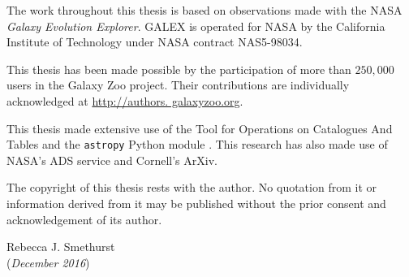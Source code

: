\documentclass[12pt,useAMS]{ociamthesis}  %
\begin{document}
\begin{originalitylong}
The work throughout this thesis is based on observations made with the NASA \emph{Galaxy Evolution Explorer}. GALEX is operated for NASA by the California Institute of Technology under NASA contract NAS5-98034.

This thesis has been made possible by the participation of more than $250,000$ users in the Galaxy Zoo project. Their contributions are individually acknowledged at \url{http://authors. galaxyzoo.org}.

This thesis made extensive use of the Tool for Operations on Catalogues And Tables \citep[TOPCAT;][]{taylor05} and the {\tt astropy} Python module \citep{astropy13}. This research has also made use of NASA's ADS service and Cornell's ArXiv.

The copyright of this thesis rests with the author. No quotation from it or information derived from it may be published without the prior consent and acknowledgement of its author. 

\begin{flushright}
Rebecca J. Smethurst
\\
(\emph{December 2016})
\end{flushright}


\end{originalitylong}
\end{document}
